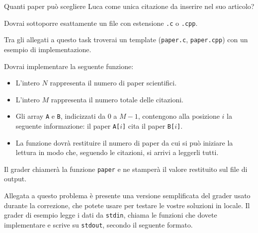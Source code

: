         Quanti paper può scegliere Luca come unica citazione da inserire nel suo articolo?


\Implementation


Dovrai sottoporre esattamente un file con estensione \texttt{.c} o \texttt{.cpp}.

\begin{warning}
Tra gli allegati a questo task troverai un template (\texttt{paper.c}, \texttt{paper.cpp}) con un esempio di implementazione.
\end{warning}

Dovrai implementare la seguente funzione:

\begin{itemize}[nolistsep]
	
	\begin{itemize}[nolistsep]
	  \item L'intero $N$ rappresenta il numero di paper scientifici.
	  \item L'intero $M$ rappresenta il numero totale delle citazioni.
          \item Gli array \texttt{A} e \texttt{B}, indicizzati da $0$ a $M-1$, contengono alla posizione $i$ la seguente informazione: il paper \texttt{A[$i$]} cita il paper \texttt{B[$i$]}.
          \item La funzione dovrà restituire il numero di paper da cui si può iniziare la lettura in modo che, seguendo le citazioni, si arrivi a leggerli tutti.

      \end{itemize}
\end{itemize}

\medskip

Il grader chiamerà la funzione \texttt{paper} e ne stamperà il valore restituito sul file di output.



\Grader
Allegata a questo problema è presente una versione semplificata del grader usato durante la correzione, che potete usare per testare le vostre soluzioni in locale. Il grader di esempio legge i dati da \texttt{stdin}, chiama le funzioni che dovete implementare e scrive su \texttt{stdout}, secondo il seguente formato.

